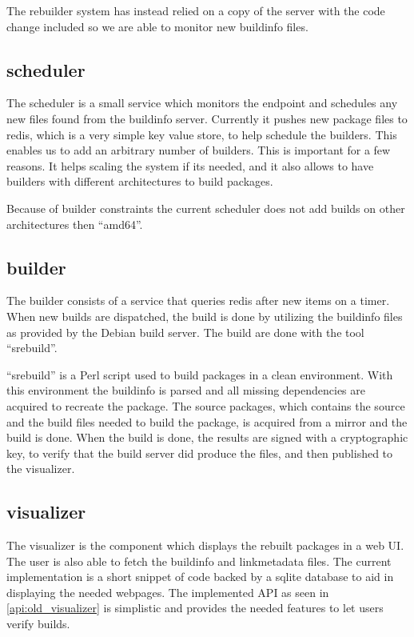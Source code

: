 \documentclass[../Main/thesis.tex]{subfiles}
\begin{document}
The rebuilder system has instead relied on a copy of the server with the code
change included so we are able to monitor new buildinfo files.

\subsection{scheduler}%
\label{sub:scheduler}
The scheduler is a small service which monitors the endpoint and schedules any
new files found from the buildinfo server. Currently it pushes new package files
to redis, which is a very simple key value store, to help schedule the builders.
This enables us to add an arbitrary number of builders. This is important for a
few reasons. It helps scaling the system if its needed, and it also allows to
have builders with different architectures to build packages.

Because of builder constraints the current scheduler does not add builds on
other architectures then ``amd64''.

\subsection{builder}%
\label{sub:builder}
The builder consists of a service that queries redis after new items on a timer.
When new builds are dispatched, the build is done by utilizing the buildinfo
files as provided by the Debian build server. The build are done with the tool
``srebuild''.

``srebuild'' is a Perl script used to build packages in a clean environment.
With this environment the buildinfo is parsed and all missing dependencies are
acquired to recreate the package. The source packages, which contains the source
and the build files needed to build the package, is acquired from a mirror and
the build is done. When the build is done, the results are signed with a
cryptographic key, to verify that the build server did produce the files, and
then published to the visualizer.


\subsection{visualizer}%
\label{sub:visualizer}
The visualizer is the component which displays the rebuilt packages in a web UI.
The user is also able to fetch the buildinfo and linkmetadata files. The current
implementation is a short snippet of code backed by a sqlite database to aid in
displaying the needed webpages. The implemented API as seen in
\ref{api:old_visualizer} is simplistic and provides the needed features to let
users verify builds.
\end{document}
